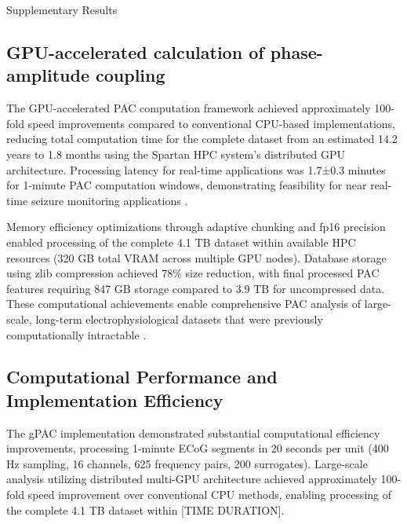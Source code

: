 Supplementary Results

\subsection{GPU-accelerated calculation of phase-amplitude coupling}
The GPU-accelerated PAC computation framework achieved approximately 100-fold speed improvements compared to conventional CPU-based implementations, reducing total computation time for the complete dataset from an estimated 14.2 years to 1.8 months using the Spartan HPC system's distributed GPU architecture. Processing latency for real-time applications was 1.7±0.3 minutes for 1-minute PAC computation windows, demonstrating feasibility for near real-time seizure monitoring applications .

	Memory efficiency optimizations through adaptive chunking and fp16 precision enabled processing of the complete 4.1 TB dataset within available HPC resources (320 GB total VRAM across multiple GPU nodes). Database storage using zlib compression achieved 78\% size reduction, with final processed PAC features requiring 847 GB storage compared to 3.9 TB for uncompressed data. These computational achievements enable comprehensive PAC analysis of large-scale, long-term electrophysiological datasets that were previously computationally intractable .


\subsection{Computational Performance and Implementation Efficiency}
The gPAC implementation demonstrated substantial computational efficiency improvements, processing 1-minute ECoG segments in 20 seconds per unit (400 Hz sampling, 16 channels, 625 frequency pairs, 200 surrogates). Large-scale analysis utilizing distributed multi-GPU architecture achieved approximately 100-fold speed improvement over conventional CPU methods, enabling processing of the complete 4.1 TB dataset within [TIME DURATION].

